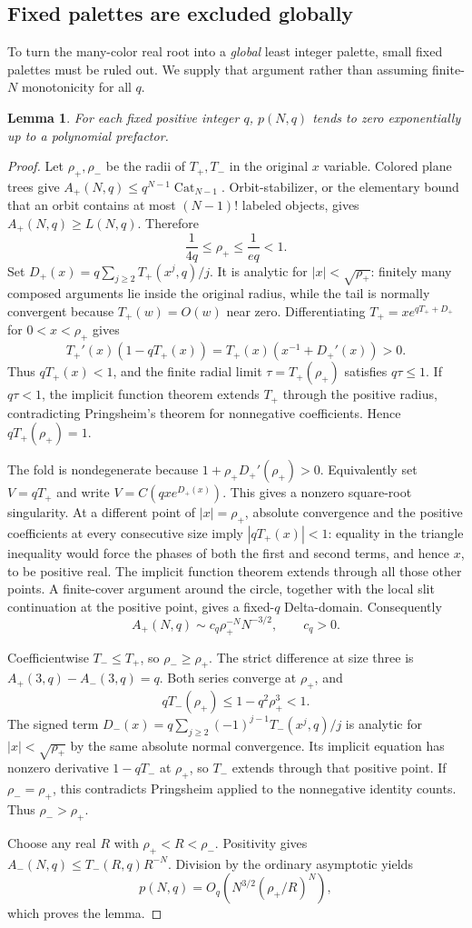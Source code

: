 \documentclass[11pt]{article}
\newtheorem{lemma}[theorem]{Lemma}
\theoremstyle{definition}
\newcommand{\Cay}{C}
\begin{document}
\subsection{Fixed palettes are excluded globally}
To turn the many-color real root into a \emph{global} least integer palette, small fixed palettes must be ruled out. We supply that argument rather than assuming finite-$N$ monotonicity for all $q$.

\begin{lemma}\label{mct:lem:fixedq}
For each fixed positive integer $q$, $p(N,q)$ tends to zero exponentially up to a polynomial prefactor.
\end{lemma}
\begin{proof}
Let $\rho_+,\rho_-$ be the radii of $T_+,T_-$ in the original $x$ variable. Colored plane trees give
$A_+(N,q)\le q^{N-1}\operatorname{Cat}_{N-1}$. Orbit-stabilizer, or the elementary bound that an orbit contains at most $(N-1)!$ labeled objects, gives $A_+(N,q)\ge L(N,q)$. Therefore
\[
 \frac1{4q}\le\rho_+\le\frac1{eq}<1.
\]
Set $D_+(x)=q\sum_{j\ge2}T_+(x^j,q)/j$. It is analytic for $|x|<\sqrt{\rho_+}$: finitely many composed arguments lie inside the original radius, while the tail is normally convergent because $T_+(w)=O(w)$ near zero. Differentiating $T_+=x e^{qT_++D_+}$ for $0<x<\rho_+$ gives
\[
 T_+'(x)(1-qT_+(x))=T_+(x)(x^{-1}+D_+'(x))>0.
\]
Thus $qT_+(x)<1$, and the finite radial limit $\tau=T_+(\rho_+)$ satisfies $q\tau\le1$. If $q\tau<1$, the implicit function theorem extends $T_+$ through the positive radius, contradicting Pringsheim's theorem for nonnegative coefficients. Hence $qT_+(\rho_+)=1$.

The fold is nondegenerate because $1+\rho_+D_+'(\rho_+)>0$. Equivalently set $V=qT_+$ and write $V=\Cay(qxe^{D_+(x)})$. This gives a nonzero square-root singularity. At a different point of $|x|=\rho_+$, absolute convergence and the positive coefficients at every consecutive size imply $|qT_+(x)|<1$: equality in the triangle inequality would force the phases of both the first and second terms, and hence $x$, to be positive real. The implicit function theorem extends through all those other points. A finite-cover argument around the circle, together with the local slit continuation at the positive point, gives a fixed-$q$ Delta-domain. Consequently
\[
 A_+(N,q)\sim c_q\rho_+^{-N}N^{-3/2},\qquad c_q>0.
\]

Coefficientwise $T_-\le T_+$, so $\rho_-\ge\rho_+$. The strict difference at size three is $A_+(3,q)-A_-(3,q)=q$. Both series converge at $\rho_+$, and
\[
 qT_-(\rho_+)\le1-q^2\rho_+^3<1.
\]
The signed term $D_-(x)=q\sum_{j\ge2}(-1)^{j-1}T_-(x^j,q)/j$ is analytic for $|x|<\sqrt{\rho_+}$ by the same absolute normal convergence. Its implicit equation has nonzero derivative $1-qT_-$ at $\rho_+$, so $T_-$ extends through that positive point. If $\rho_-=\rho_+$, this contradicts Pringsheim applied to the nonnegative identity counts. Thus $\rho_->\rho_+$.

Choose any real $R$ with $\rho_+<R<\rho_-$. Positivity gives $A_-(N,q)\le T_-(R,q)R^{-N}$. Division by the ordinary asymptotic yields
\[
 p(N,q)=O_q\left(N^{3/2}(\rho_+/R)^N\right),
\]
which proves the lemma.
\end{proof}
\end{document}

